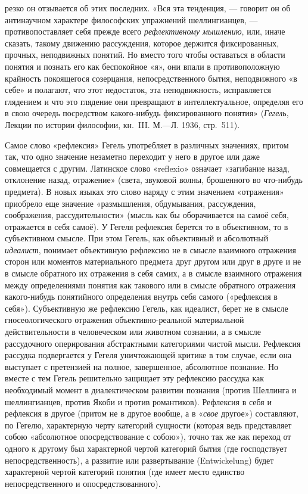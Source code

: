 \begin{enumerate}
резко он отзывается об этих последних. «Вся эта тенденция, — говорит он об
антинаучном характере философских упражнений шеллингианцев, —
противопоставляет себя прежде всего {\em рефлективному мышлению}, или,
иначе сказать, такому движению рассуждения, которое держится фиксированных,
прочных, неподвижных понятий. Но вместо того чтобы оставаться в области
понятия и познать его как беспокойное «я», они впали в противоположную
крайность покоящегося созерцания, непосредственного бытия, неподвижного «в
себе» и полагают, что этот недостаток, эта неподвижность, исправляется
глядением и что это глядение они превращают в интеллектуальное, определяя
его в свою очередь посредством какого-нибудь фиксированного понятия»
({\em Гегель}, Лекции по истории философии, кн.~III. М.—Л. 1936,
стр.~511).
\end{enumerate}
Самое слово «рефлексия» Гегель употребляет в различных значениях, притом
так, что одно значение незаметно переходит у него в другое или даже
совмещается с другим. Латинское слово «reflexio» означает «загибание назад,
отклонение назад, отражение» (света, звуковой волны, брошенного во
что-нибудь предмета). В новых языках это слово наряду с этим значением
«отражения» приобрело еще значение «размышления, обдумывания, рассуждения,
соображения, рассудительности» (мысль как бы оборачивается на самоё себя,
отражается в себя самоё). У Гегеля рефлексия берется то в объективном, то в
субъективном смысле. При этом Гегель, как объективный и абсолютный
{\em идеалист}, понимает объективную рефлексию не в смысле взаимного
отражения сторон или моментов материального предмета друг другом или друг в
друге и не в смысле обратного их отражения в себя самих, а в смысле
взаимного отражения между определениями понятия как такового или в смысле
обратного отражения какого-нибудь понятийного определения внутрь себя
самого («рефлексия в себя»). Субъективную же рефлексию Гегель, как
идеалист, берет не в смысле гносеологического отражения объективно-реальной
материальной действительности в человеческом или животном сознании, а в
смысле рассудочного оперирования абстрактными категориями чистой мысли.
Рефлексия рассудка подвергается у Гегеля уничтожающей критике в том случае,
если она выступает с претензией на полное, завершенное, абсолютное
познание. Но вместе с тем Гегель решительно защищает эту рефлексию рассудка
как необходимый момент в диалектическом развитии познания (против Шеллинга
и шеллингианцев, против Якоби и против романтиков). Рефлексия в себя и
рефлексия в другое (притом не в другое вообще, а в «{\em свое} другое»)
составляют, по Гегелю, характерную черту категорий сущности (которая ведь
представляет собою «абсолютное опосредствование с собою»), точно так же как
переход от одного к другому был характерной чертой категорий бытия (где
господствует непосредственность), а развитие или развертывание
(Entwickelung) будет характерной чертой категорий понятия (где имеет место
единство непосредственного и опосредствованного).

